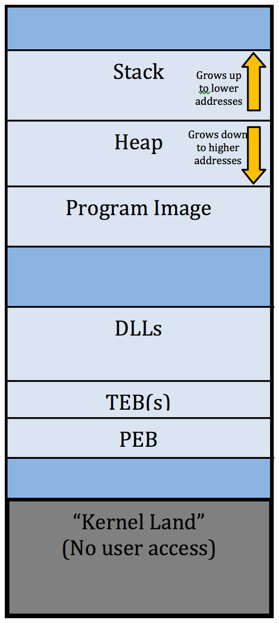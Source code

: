 \documentclass[aspectratio=169]{beamer}
\begin{document}
\begin{frame}
\begin{columns}
\begin{column}{.7\textwidth}
\begin{center}
        \includegraphics[scale=0.30]{the-heap}
      \end{center}
    \end{column}
  \end{columns}
\end{frame}
\end{document}
